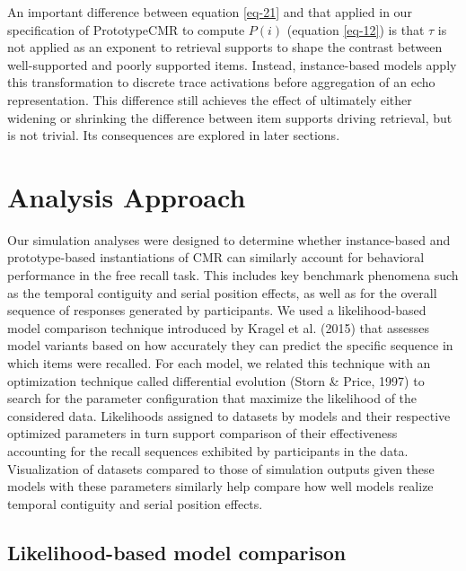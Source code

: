 \documentclass[
  letterpaper,
]{article}
\begin{document}
An important difference between equation \ref{eq-21} and that applied in
our specification of PrototypeCMR to compute \(P(i)\) (equation
\ref{eq-12}) is that \(\tau\) is not applied as an exponent to retrieval
supports to shape the contrast between well-supported and poorly
supported items. Instead, instance-based models apply this
transformation to discrete trace activations before aggregation of an
echo representation. This difference still achieves the effect of
ultimately either widening or shrinking the difference between item
supports driving retrieval, but is not trivial. Its consequences are
explored in later sections.

\hypertarget{analysis-approach}{%
\section{Analysis Approach}\label{analysis-approach}}

Our simulation analyses were designed to determine whether
instance-based and prototype-based instantiations of CMR can similarly
account for behavioral performance in the free recall task. This
includes key benchmark phenomena such as the temporal contiguity and
serial position effects, as well as for the overall sequence of
responses generated by participants. We used a likelihood-based model
comparison technique introduced by Kragel et al. (2015) that assesses
model variants based on how accurately they can predict the specific
sequence in which items were recalled. For each model, we related this
technique with an optimization technique called differential evolution
(Storn \& Price, 1997) to search for the parameter configuration that
maximize the likelihood of the considered data. Likelihoods assigned to
datasets by models and their respective optimized parameters in turn
support comparison of their effectiveness accounting for the recall
sequences exhibited by participants in the data. Visualization of
datasets compared to those of simulation outputs given these models with
these parameters similarly help compare how well models realize temporal
contiguity and serial position effects.

\hypertarget{likelihood-based-model-comparison}{%
\subsection{Likelihood-based model
comparison}\label{likelihood-based-model-comparison}}
\end{document}
